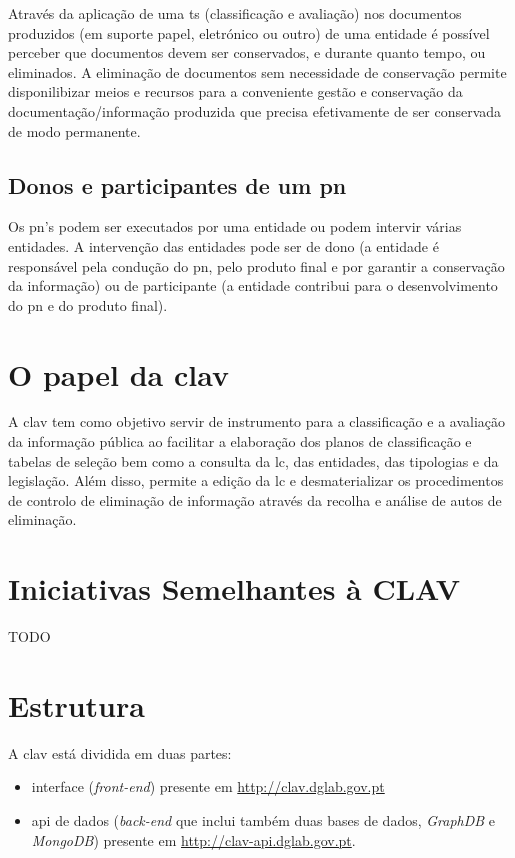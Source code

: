 Através da aplicação de uma \acrshort{ts} (classificação e avaliação) nos documentos produzidos (em suporte papel, eletrónico ou outro) de uma entidade é possível perceber que documentos devem ser conservados, e durante quanto tempo, ou eliminados. A eliminação de documentos sem necessidade de conservação permite disponilibizar meios e recursos para a conveniente gestão e conservação da documentação/informação produzida que precisa efetivamente de ser conservada de modo permanente.~\cite{ts}

\subsection{Donos e participantes de um \acrlong{pn}}

Os \acrshort{pn}'s podem ser executados por uma entidade ou podem intervir várias entidades. A intervenção das entidades pode ser de dono (a entidade é responsável pela condução do \acrshort{pn}, pelo produto final e por garantir a conservação da informação) ou de participante (a entidade contribui para o desenvolvimento do \acrshort{pn} e do produto final).

\section{O papel da \acrshort{clav}}

A \acrshort{clav} tem como objetivo servir de instrumento para a classificação e a avaliação da informação pública ao facilitar a elaboração dos planos de classificação e tabelas de seleção bem como a consulta da \acrshort{lc}, das entidades, das tipologias e da legislação. Além disso, permite a edição da \acrshort{lc} e desmaterializar os procedimentos de controlo de eliminação de informação através da recolha e análise de autos de eliminação.

\section{Iniciativas Semelhantes à CLAV}
TODO

\section{Estrutura}
A \acrshort{clav} está dividida em duas partes:
\begin{itemize}
    \item interface (\textit{front-end}) presente em \url{http://clav.dglab.gov.pt}
    \item \acrshort{api} de dados (\textit{back-end} que inclui também duas bases de dados, \textit{GraphDB} e \textit{MongoDB}) presente em \url{http://clav-api.dglab.gov.pt}.
\end{itemize}

